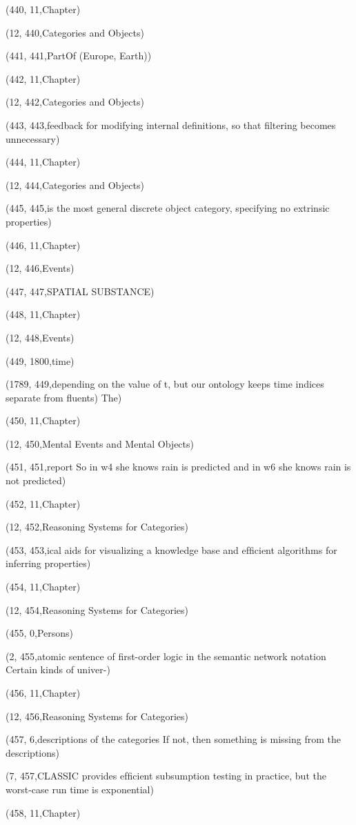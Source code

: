 (440, 11,Chapter)

(12, 440,Categories and Objects)

(441, 441,PartOf (Europe, Earth))

(442, 11,Chapter)

(12, 442,Categories and Objects)

(443, 443,feedback for modifying internal deﬁnitions, so that ﬁltering becomes unnecessary)

(444, 11,Chapter)

(12, 444,Categories and Objects)

(445, 445,is the most general discrete object category, specifying no extrinsic properties)

(446, 11,Chapter)

(12, 446,Events)

(447, 447,SPATIAL SUBSTANCE)

(448, 11,Chapter)

(12, 448,Events)

(449, 1800,time)

(1789, 449,depending on the value of t, but our ontology keeps time indices separate from ﬂuents) The)

(450, 11,Chapter)

(12, 450,Mental Events and Mental Objects)

(451, 451,report So in w4 she knows rain is predicted and in w6 she knows rain is not predicted)

(452, 11,Chapter)

(12, 452,Reasoning Systems for Categories)

(453, 453,ical aids for visualizing a knowledge base and efﬁcient algorithms for inferring properties)

(454, 11,Chapter)

(12, 454,Reasoning Systems for Categories)

(455, 0,Persons)

(2, 455,atomic sentence of ﬁrst-order logic in the semantic network notation Certain kinds of univer-)

(456, 11,Chapter)

(12, 456,Reasoning Systems for Categories)

(457, 6,descriptions of the categories If not, then something is missing from the descriptions)

(7, 457,CLASSIC provides efﬁcient subsumption testing in practice, but the worst-case run time is exponential)

(458, 11,Chapter)

